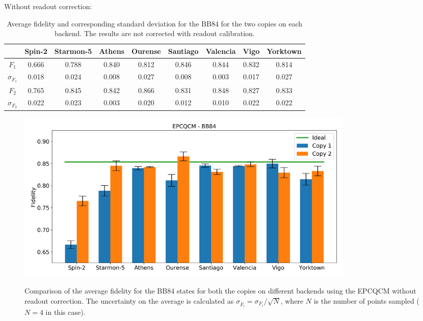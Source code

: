 Without readout correction:
\begin{table}[H]
    \centering
    \begin{tabular}{|c|c|c|c|c|c|c|c|c|}
    \hline
    \textbf{} & \textbf{Spin-2} & \textbf{Starmon-5} & \textbf{Athens} & \textbf{Ourense} & \textbf{Santiago} & \textbf{Valencia} & \textbf{Vigo} & \textbf{Yorktown} \\ \hline
    $F_1$              & 0.666  & 0.788 & 0.840 & 0.812 & 0.846 & 0.844 & 0.832 & 0.814 \\ \hline
    $\sigma_{F_1}$     & 0.018  & 0.024 & 0.008 & 0.027 & 0.008 & 0.003 & 0.017 & 0.027 \\ \hline
    $F_2$              & 0.765  & 0.845 & 0.842 & 0.866 & 0.831 & 0.848 & 0.827 & 0.833 \\ \hline
    $\sigma_{F_2}$     & 0.022  & 0.023 & 0.003 & 0.020 & 0.012 & 0.010 & 0.022 & 0.022 \\ \hline
    \end{tabular}
    \caption{Average fidelity and corresponding standard deviation for the BB84 for the two copies on each backend. The results are not corrected with readout calibration.}
\end{table}

\begin{figure}[H]
  \centering
          \includegraphics[width=0.8\textwidth]{Figures/Economical/Histograms/histo_bb84.png}
      \label{fig:epc_histo_bb84_not_corrected}
      \caption{Comparison of the average fidelity for the BB84 states for both the copies on different backends using the EPCQCM without readout correction. The uncertainty on the average is calculated as $\sigma_{\overline{F}_i}=\sigma_{F_i}/\sqrt{N}$, where $N$ is the number of points sampled ($N=4$ in this case).}
\end{figure}
